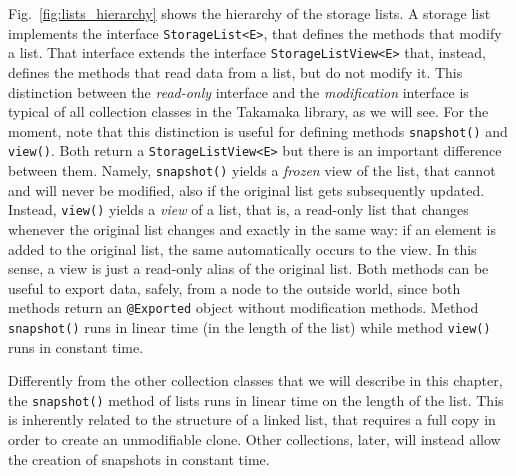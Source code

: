 Fig.~\ref{fig:lists_hierarchy} shows the hierarchy of the storage lists.
A storage list implements the interface \texttt{StorageList<E>},
that defines the methods that modify a list.
That interface extends the interface
\texttt{StorageListView<E>}
that, instead, defines the methods
that read data from a list, but do not modify it. This distinction between the \emph{read-only}
interface and the \emph{modification} interface is typical of all collection classes in the
Takamaka library, as we will see. For the moment, note that this distinction is useful
for defining methods \texttt{snapshot()}
and \texttt{view()}. Both return
a \texttt{StorageListView<E>} but there
is an important difference between them. Namely, \texttt{snapshot()} yields a
\emph{frozen} view of the list, that cannot and will never be modified,
also if the original list gets subsequently updated. Instead,
\texttt{view()} yields a \emph{view} of a list, that is, a read-only list that changes whenever
the original list changes and exactly in the same way: if an element is added to the original
list, the same automatically occurs to the view.
In this sense, a view is just a read-only alias of the original list.
Both methods can be useful to export data, safely,
from a node to the outside world, since both methods
return an \texttt{@Exported}
object without modification methods.
Method \texttt{snapshot()} runs in linear time (in the length of the list)
while method \texttt{view()} runs in constant time.
%
\begin{commentbox}
Differently from the other collection classes that we will describe in this chapter,
the \texttt{snapshot()} method of lists runs in linear time on the length of the list.
This is inherently related to the structure of a linked list, that requires a full
copy in order to create an unmodifiable clone. Other collections, later, will instead
allow the creation of snapshots in constant time.
\end{commentbox}
%
